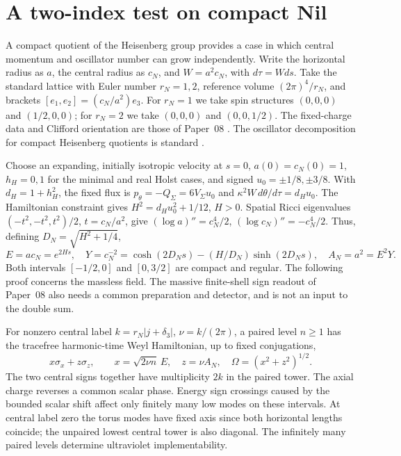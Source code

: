 \section{A two-index test on compact Nil}\label{sec:06}
A compact quotient of the Heisenberg group provides a case in which central momentum and oscillator number can grow independently. Write the horizontal radius as $a$, the central radius as $c_N$, and $W=a^2c_N$, with $d\tau=W ds$. Take the standard lattice with Euler number $r_N=1,2$, reference volume $(2\pi)^4/r_N$, and brackets $[e_1,e_2]=(c_N/a^2)e_3$. For $r_N=1$ we take spin structures $(0,0,0)$ and $(1/2,0,0)$; for $r_N=2$ we take $(0,0,0)$ and $(0,0,1/2)$. The fixed-charge data and Clifford orientation are those of Paper~08 \cite{paper8}. The oscillator decomposition for compact Heisenberg quotients is standard \cite{ammann}.

Choose an expanding, initially isotropic velocity at $s=0$, $a(0)=c_N(0)=1$, $h_H=0,1$ for the minimal and real Holst cases, and signed $u_0=\pm1/8,\pm3/8$. With $d_H=1+h_H^2$, the fixed flux is $p_\theta=-Q_\Sigma=6V_\Sigma u_0$ and $\kappa^2 W\,d\theta/d\tau=d_Hu_0$. The Hamiltonian constraint gives $H^2=d_Hu_0^2+1/12$, $H>0$. Spatial Ricci eigenvalues $(-t^2,-t^2,t^2)/2$, $t=c_N/a^2$, give $(\log a)''=c_N^4/2$, $(\log c_N)''=-c_N^4/2$. Thus, defining $D_N=\sqrt{H^2+1/4}$,
\begin{equation}
 E=ac_N=e^{2Hs},\quad Y=c_N^{-2}=\cosh(2D_Ns)-(H/D_N)\sinh(2D_Ns),
 \quad A_N=a^2=E^2Y .                                      \label{eq:nilbg}
\end{equation}
Both intervals $[-1/2,0]$ and $[0,3/2]$ are compact and regular. The following proof concerns the massless field. The massive finite-shell sign readout of Paper~08 also needs a common preparation and detector, and is not an input to the double sum.

For nonzero central label $k=r_N|j+\delta_3|$, $\nu=k/(2\pi)$, a paired level $n\ge1$ has the tracefree harmonic-time Weyl Hamiltonian, up to fixed conjugations,
\begin{equation}
 x\sigma_x+z\sigma_z,\qquad x=\sqrt{2\nu n}\,E,\quad z=\nu A_N,
 \quad \Omega=(x^2+z^2)^{1/2}.                              \label{eq:nilham}
\end{equation}
The two central signs together have multiplicity $2k$ in the paired tower. The axial charge reverses a common scalar phase. Energy sign crossings caused by the bounded scalar shift affect only finitely many low modes on these intervals. At central label zero the torus modes have fixed axis since both horizontal lengths coincide; the unpaired lowest central tower is also diagonal. The infinitely many paired levels determine ultraviolet implementability.

